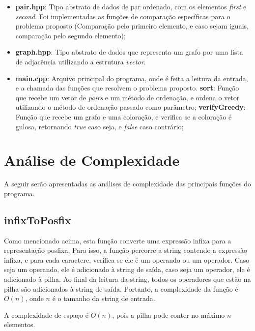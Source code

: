 \documentclass{article}
\begin{document}
\begin{itemize}
    \item \textbf{pair.hpp}: Tipo abstrato de dados de par ordenado, com os elementos \emph{first} e \emph{second}. Foi implementadas as funções de comparação específicas para o problema proposto (Comparação pelo primeiro elemento, e caso sejam iguais, comparação pelo segundo elemento);
    \item \textbf{graph.hpp}: Tipo abstrato de dados que representa um grafo por uma lista de adjacência utilizando a estrutura \emph{vector}. 
    \item \textbf{main.cpp}: Arquivo principal do programa, onde é feita a leitura da entrada, e a chamada das funções que resolvem o problema proposto.
        \subitem \textbf{sort}: Função que recebe um vetor de \emph{pairs} e um método de ordenação, e ordena o vetor utilizando o método de ordenação passado como parâmetro;
        \subitem \textbf{verifyGreedy}: Função que recebe um grafo e uma coloração, e verifica se a coloração é gulosa, retornando \emph{true} caso seja, e \emph{false} caso contrário;
    
\end{itemize}

\section{Análise de Complexidade}

A seguir serão apresentadas as análises de complexidade das principais funções do programa.

\subsection{infixToPosfix}
Como mencionado acima, esta função converte uma expressão infixa para a representação posfixa. Para isso, a função percorre a string contendo a expressão infixa, e para cada caractere, verifica se ele é um operando ou um operador. Caso seja um operando, ele é adicionado à string de saída, caso seja um operador, ele é adicionado à pilha. Ao final da leitura da string, todos os operadores que estão na pilha são adicionados à string de saída. Portanto, a complexidade da função é $O(n)$, onde $n$ é o tamanho da string de entrada.

A complexidade de espaço é $O(n)$, pois a pilha pode conter no máximo $n$ elementos.
\end{document}
